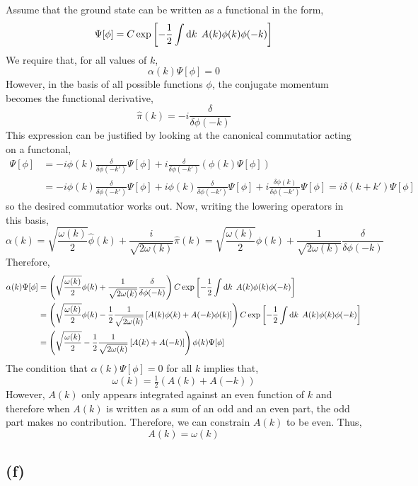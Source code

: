 \documentclass[12pt]{extarticle}
\begin{document}
Assume that the ground state can be written as a functional in the form,
\[ \Psi[\phi] = C \exp{\left[ - \frac{1}{2} \int  \mathrm{d}k \: \: A(k) \phi(k) \phi(-k) \right] } \]
We require that, for all values of $k$,
\[ \alpha(k) \Psi[\phi ] = 0\]
However, in the basis of all possible functions $\phi$, the conjugate momentum becomes the functional derivative, \[\hat{\pi}(k) = - i \frac{\delta}{\delta \phi(-k)} \]
This expression can be justified by looking at the canonical commutatior acting on a functonal,
\begin{align*}
[\hat{\phi}(k), \hat{\pi}(k')] \Psi[\phi] & = - i \phi(k) \frac{\delta}{\delta \phi(-k')} \Psi[\phi] + i \frac{\delta}{\delta \phi(-k')} \left( \phi(k) \Psi[\phi] \right)
\\
& = - i \phi(k) \frac{\delta}{\delta \phi(-k')} \Psi[\phi] + i \phi(k)  \frac{\delta}{\delta \phi(-k')}  \Psi[\phi] + i \frac{\delta \phi(k)}{\delta \phi(-k')} \Psi[\phi] = i \delta(k + k') \Psi[\phi]
\end{align*}
so the desired commutatior works out. Now, writing the lowering operators in this basis,
\[ \alpha(k) = \sqrt{\frac{\omega(k)}{2}} \hat{\phi}(k) + \frac{i}{\sqrt{2 \omega(k)}} \hat{\pi}(k) = \sqrt{\frac{\omega(k)}{2}} \phi(k) + \frac{1}{\sqrt{2 \omega(k)}} \frac{\delta}{\delta \phi(-k)} \]
Therefore,
\begin{align*}
\alpha(k) \Psi[\phi] & = \left( \sqrt{\frac{\omega(k)}{2}} \phi(k) + \frac{1}{\sqrt{2 \omega(k)}} \frac{\delta}{\delta \phi(-k)} \right) C \exp{\left[ - \frac{1}{2} \int  \mathrm{d}k \: \: A(k) \phi(k) \phi(-k) \right] }
\\ 
& = \left( \sqrt{\frac{\omega(k)}{2}} \phi(k) - \frac{1}{2} \frac{1}{\sqrt{2 \omega(k)}} \left[ A(k) \phi(k) + A(-k) \phi(k) \right] \right) C \exp{\left[ - \frac{1}{2} \int  \mathrm{d}k \: \: A(k) \phi(k) \phi(-k) \right] } 
\\
& = \left( \sqrt{\frac{\omega(k)}{2}}  - \frac{1}{2} \frac{1}{\sqrt{2 \omega(k)}} \left[ A(k) + A(-k) \right] \right) \phi(k) \Psi[\phi]
\\
\end{align*}
The condition that $\alpha(k) \Psi[\phi] = 0$ for all $k$ implies that,
\[ \omega(k) = \tfrac{1}{2} \left( A(k) + A(-k) \right) \]
However, $A(k)$ only appears integrated against an even function of $k$ and therefore when $A(k)$ is written as a sum of an odd and an even part, the odd part makes no contribution. Therefore, we can constrain $A(k)$ to be even. Thus,
\[A(k) = \omega(k)\]

\subsection*{(f)}
\end{document}
